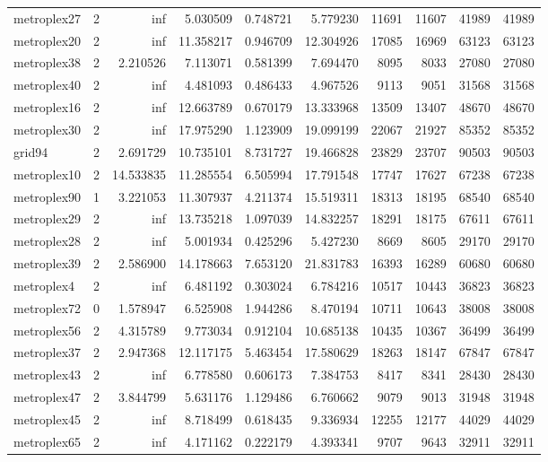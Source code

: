 \begin{longtable}{|l|r|r|r|r|r|r|r|r|r|}
metroplex27 & 2 & inf & 5.030509 & 0.748721 & 5.779230 & 11691 & 11607 & 41989 & 41989 \\
metroplex20 & 2 & inf & 11.358217 & 0.946709 & 12.304926 & 17085 & 16969 & 63123 & 63123 \\
metroplex38 & 2 & 2.210526 & 7.113071 & 0.581399 & 7.694470 & 8095 & 8033 & 27080 & 27080 \\
metroplex40 & 2 & inf & 4.481093 & 0.486433 & 4.967526 & 9113 & 9051 & 31568 & 31568 \\
metroplex16 & 2 & inf & 12.663789 & 0.670179 & 13.333968 & 13509 & 13407 & 48670 & 48670 \\
metroplex30 & 2 & inf & 17.975290 & 1.123909 & 19.099199 & 22067 & 21927 & 85352 & 85352 \\
grid94 & 2 & 2.691729 & 10.735101 & 8.731727 & 19.466828 & 23829 & 23707 & 90503 & 90503 \\
metroplex10 & 2 & 14.533835 & 11.285554 & 6.505994 & 17.791548 & 17747 & 17627 & 67238 & 67238 \\
metroplex90 & 1 & 3.221053 & 11.307937 & 4.211374 & 15.519311 & 18313 & 18195 & 68540 & 68540 \\
metroplex29 & 2 & inf & 13.735218 & 1.097039 & 14.832257 & 18291 & 18175 & 67611 & 67611 \\
metroplex28 & 2 & inf & 5.001934 & 0.425296 & 5.427230 & 8669 & 8605 & 29170 & 29170 \\
metroplex39 & 2 & 2.586900 & 14.178663 & 7.653120 & 21.831783 & 16393 & 16289 & 60680 & 60680 \\
metroplex4 & 2 & inf & 6.481192 & 0.303024 & 6.784216 & 10517 & 10443 & 36823 & 36823 \\
metroplex72 & 0 & 1.578947 & 6.525908 & 1.944286 & 8.470194 & 10711 & 10643 & 38008 & 38008 \\
metroplex56 & 2 & 4.315789 & 9.773034 & 0.912104 & 10.685138 & 10435 & 10367 & 36499 & 36499 \\
metroplex37 & 2 & 2.947368 & 12.117175 & 5.463454 & 17.580629 & 18263 & 18147 & 67847 & 67847 \\
metroplex43 & 2 & inf & 6.778580 & 0.606173 & 7.384753 & 8417 & 8341 & 28430 & 28430 \\
metroplex47 & 2 & 3.844799 & 5.631176 & 1.129486 & 6.760662 & 9079 & 9013 & 31948 & 31948 \\
metroplex45 & 2 & inf & 8.718499 & 0.618435 & 9.336934 & 12255 & 12177 & 44029 & 44029 \\
metroplex65 & 2 & inf & 4.171162 & 0.222179 & 4.393341 & 9707 & 9643 & 32911 & 32911 \\

\end{longtable}
